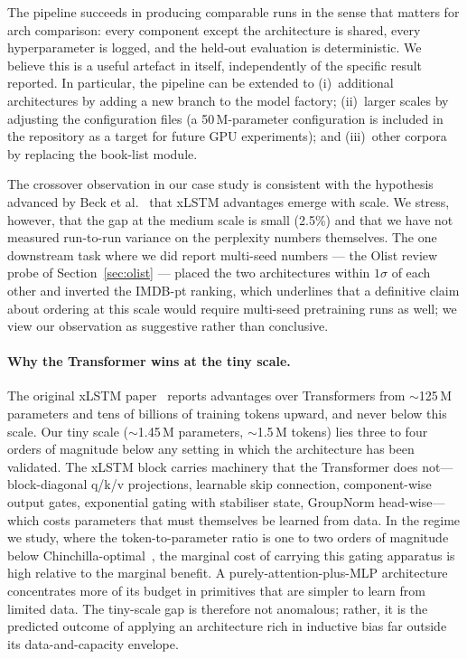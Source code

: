 \documentclass[11pt]{article}
\begin{document}
The pipeline succeeds in producing comparable runs in the sense that
matters for arch comparison: every component except the architecture is
shared, every hyperparameter is logged, and the held-out evaluation is
deterministic. We believe this is a useful artefact in itself,
independently of the specific result reported. In particular, the
pipeline can be extended to (i)~additional architectures by adding a
new branch to the model factory; (ii)~larger scales by adjusting the
configuration files (a 50\,M-parameter configuration is included in the
repository as a target for future GPU experiments); and (iii)~other
corpora by replacing the book-list module.

The crossover observation in our case study is consistent with the
hypothesis advanced by Beck et al.~\cite{beck2024} that xLSTM advantages
emerge with scale. We stress, however, that the gap at the medium
scale is small (2.5\%) and that we have not measured run-to-run
variance on the perplexity numbers themselves. The one downstream task
where we did report multi-seed numbers --- the Olist review probe of
Section~\ref{sec:olist} --- placed the two architectures within
$1\sigma$ of each other and inverted the IMDB-pt ranking, which
underlines that a definitive claim about ordering at this scale would
require multi-seed pretraining runs as well; we view our observation
as suggestive rather than conclusive.

\paragraph{Why the Transformer wins at the tiny scale.}
The original xLSTM paper~\cite{beck2024} reports advantages over
Transformers from $\sim$125\,M parameters and tens of billions of
training tokens upward, and never below this scale. Our tiny scale
($\sim$1.45\,M parameters, $\sim$1.5\,M tokens) lies three to four
orders of magnitude below any setting in which the architecture has
been validated. The xLSTM block carries machinery that the Transformer
does not---block-diagonal q/k/v projections, learnable skip connection,
component-wise output gates, exponential gating with stabiliser state,
GroupNorm head-wise---which costs parameters that must themselves be
learned from data. In the regime we study, where the token-to-parameter
ratio is one to two orders of magnitude below
Chinchilla-optimal~\cite{hoffmann2022}, the marginal cost of carrying
this gating apparatus is high relative to the marginal benefit. A
purely-attention-plus-MLP architecture concentrates more of its budget
in primitives that are simpler to learn from limited data. The tiny-scale
gap is therefore not anomalous; rather, it is the predicted outcome of
applying an architecture rich in inductive bias far outside its
data-and-capacity envelope.
\end{document}
